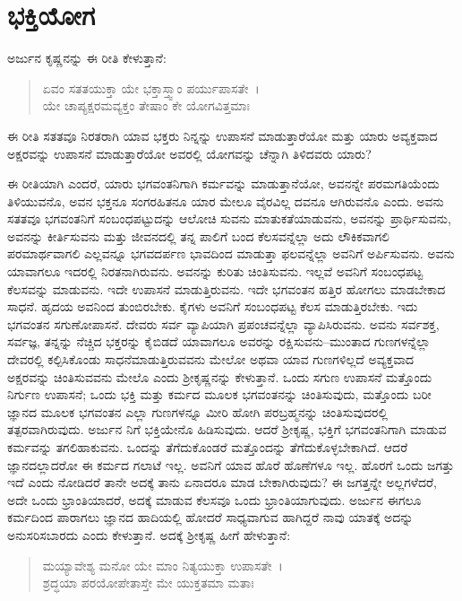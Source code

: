 
\chapter{ಭಕ್ತಿಯೋಗ}

ಅರ್ಜುನ ಕೃಷ್ಣನನ್ನು ಈ ರೀತಿ ಕೇಳುತ್ತಾನೆ:

\begin{verse}
ಏವಂ ಸತತಯುಕ್ತಾ ಯೇ ಭಕ್ತಾಸ್ತ್ವಾಂ ಪರ್ಯುಪಾಸತೇ~।\\ಯೇ ಚಾಪ್ಯಕ್ಷರಮವ್ಯಕ್ತಂ ತೇಷಾಂ ಕೇ ಯೋಗವಿತ್ತಮಾಃ 
\end{verse}

{\small ಈ ರೀತಿ ಸತತವೂ ನಿರತರಾಗಿ ಯಾವ ಭಕ್ತರು ನಿನ್ನನ್ನು ಉಪಾಸನೆ ಮಾಡುತ್ತಾರೆಯೋ ಮತ್ತು ಯಾರು ಅವ್ಯಕ್ತವಾದ ಅಕ್ಷರವನ್ನು ಉಪಾಸನೆ ಮಾಡುತ್ತಾರೆಯೋ ಅವರಲ್ಲಿ ಯೋಗವನ್ನು ಚೆನ್ನಾಗಿ ತಿಳಿದವರು ಯಾರು?}

ಈ ರೀತಿಯಾಗಿ ಎಂದರೆ, ಯಾರು ಭಗವಂತನಿಗಾಗಿ ಕರ್ಮವನ್ನು ಮಾಡುತ್ತಾನೆಯೋ, ಅವನನ್ನೇ ಪರಮಗತಿಯೆಂದು ತಿಳಿಯುವನೊ, ಅವನ ಭಕ್ತನೂ ಸಂಗರಹಿತನೂ ಯಾರ ಮೇಲೂ ವೈರವಿಲ್ಲ ದವನೂ ಆಗಿರುವನೊ ಎಂದು. ಅವನು ಸತತವೂ ಭಗವಂತನಿಗೆ ಸಂಬಂಧಪಟ್ಟುದನ್ನು ಆಲೋಚಿ ಸುವನು ಮಾತುಕತೆಯಾಡುವನು, ಅವನನ್ನು ಪ್ರಾರ್ಥಿಸುವನು, ಅವನನ್ನು ಕೀರ್ತಿಸುವನು ಮತ್ತು ಜೀವನದಲ್ಲಿ ತನ್ನ ಪಾಲಿಗೆ ಬಂದ ಕೆಲಸವನ್ನೆಲ್ಲಾ ಅದು ಲೌಕಿಕವಾಗಲಿ ಪರಮಾರ್ಥವಾಗಲಿ ಎಲ್ಲವನ್ನೂ ಭಗವದರ್ಪಣ ಭಾವದಿಂದ ಮಾಡುತ್ತಾ ಫಲವನ್ನೆಲ್ಲಾ ಅವನಿಗೆ ಅರ್ಪಿಸುವನು. ಅವನು ಯಾವಾಗಲೂ ಇದರಲ್ಲಿ ನಿರತನಾಗಿರುವನು. ಅವನನ್ನು ಕುರಿತು ಚಿಂತಿಸುವನು. ಇಲ್ಲವೆ ಅವನಿಗೆ ಸಂಬಂಧಪಟ್ಟ ಕೆಲಸವನ್ನು ಮಾಡುವನು. ಇದೇ ಉಪಾಸನೆ ಮಾಡುತ್ತಿರುವನು. ಇದೇ ಭಗವಂತನ ಹತ್ತಿರ ಹೋಗಲು ಮಾಡಬೇಕಾದ ಸಾಧನೆ. ಹೃದಯ ಅವನಿಂದ ತುಂಬಿರಬೇಕು. ಕೈಗಳು ಅವನಿಗೆ ಸಂಬಂಧಪಟ್ಟ ಕೆಲಸ ಮಾಡುತ್ತಿರಬೇಕು. ಇದು ಭಗವಂತನ ಸಗುಣೋಪಾಸನೆ. ದೇವರು ಸರ್ವ ವ್ಯಾಪಿಯಾಗಿ ಪ್ರಪಂಚವನ್ನೆಲ್ಲಾ ವ್ಯಾಪಿಸಿರುವನು. ಅವನು ಸರ್ವಶಕ್ತ, ಸರ್ವಜ್ಞ, ತನ್ನನ್ನು ನೆಚ್ಚಿದ ಭಕ್ತರನ್ನು ಕೈಬಿಡದೆ ಯಾವಾಗಲೂ ಅವರನ್ನು ರಕ್ಷಿಸುವನು–ಮುಂತಾದ ಗುಣಗಳನ್ನೆಲ್ಲಾ ದೇವರಲ್ಲಿ ಕಲ್ಪಿಸಿಕೊಂಡು ಸಾಧನೆಮಾಡುತ್ತಿರುವವನು ಮೇಲೋ ಅಥವಾ ಯಾವ ಗುಣಗಳಿಲ್ಲದೆ ಅವ್ಯಕ್ತವಾದ ಅಕ್ಷರವನ್ನು ಚಿಂತಿಸುವವನು ಮೇಲೊ ಎಂದು ಶ‍್ರೀಕೃಷ್ಣನನ್ನು ಕೇಳುತ್ತಾನೆ. ಒಂದು ಸಗುಣ ಉಪಾಸನೆ ಮತ್ತೊಂದು ನಿರ್ಗುಣ ಉಪಾಸನೆ; ಒಂದು ಭಕ್ತಿ ಮತ್ತು ಕರ್ಮದ ಮೂಲಕ ಭಗವಂತನನ್ನು ಚಿಂತಿಸುವುದು, ಮತ್ತೊಂದು ಬರೀ ಜ್ಞಾನದ ಮೂಲಕ ಭಗವಂತನ ಎಲ್ಲಾ ಗುಣಗಳನ್ನೂ ಮೀರಿ ಹೋಗಿ ಪರಬ್ರಹ್ಮನನ್ನು ಚಿಂತಿಸುವುದರಲ್ಲಿ ತತ್ಪರವಾಗಿರುವುದು. ಅರ್ಜುನ ನಿಗೆ ಭಕ್ತಿಯೇನೊ ಹಿಡಿಸುವುದು. ಆದರೆ ಶ‍್ರೀಕೃಷ್ಣ, ಭಕ್ತಿಗೆ ಭಗವಂತನಿಗಾಗಿ ಮಾಡುವ ಕರ್ಮವನ್ನು ತಗಲಿಹಾಕುವನು. ಒಂದನ್ನು ತೆಗೆದುಕೊಂಡರೆ ಮತ್ತೊಂದನ್ನು ತೆಗೆದುಕೊಳ್ಳಬೇಕಾಗಿದೆ. ಆದರೆ ಜ್ಞಾನದಲ್ಲಾದರೋ ಈ ಕರ್ಮದ ಗಲಾಟೆ ಇಲ್ಲ. ಅವನಿಗೆ ಯಾವ ಹೊರೆ ಹೊಣೆಗಳೂ ಇಲ್ಲ. ಹೊರಗೆ ಒಂದು ಜಗತ್ತು ಇದೆ ಎಂದು ನೋಡಿದರೆ ತಾನೇ ಅದಕ್ಕೆ ತಾನು ಏನಾದರೂ ಮಾಡ ಬೇಕಾಗಿರುವುದು? ಈ ಜಗತ್ತನ್ನೇ ಅಲ್ಲಗಳೆದರೆ, ಅದೇ ಒಂದು ಭ್ರಾಂತಿಯಾದರೆ, ಅದಕ್ಕೆ ಮಾಡುವ ಕೆಲಸವೂ ಒಂದು ಭ್ರಾಂತಿಯಾಗುವುದು. ಅರ್ಜುನ ಈಗಲೂ ಕರ್ಮದಿಂದ ಪಾರಾಗಲು ಜ್ಞಾನದ ಹಾದಿಯಲ್ಲಿ ಹೋದರೆ ಸಾಧ್ಯವಾಗುವ ಹಾಗಿದ್ದರೆ ನಾವು ಯಾತಕ್ಕೆ ಅದನ್ನು ಅನುಸರಿಸಬಾರದು ಎಂದು ಕೇಳುತ್ತಾನೆ. ಅದಕ್ಕೆ ಶ‍್ರೀಕೃಷ್ಣ ಹೀಗೆ ಹೇಳುತ್ತಾನೆ:

\begin{verse}
ಮಯ್ಯಾವೇಶ್ಯ ಮನೋ ಯೇ ಮಾಂ ನಿತ್ಯಯುಕ್ತಾ ಉಪಾಸತೇ~।\\ಶ್ರದ್ಧಯಾ ಪರಯೋಪೇತಾಸ್ತೇ ಮೇ ಯುಕ್ತತಮಾ ಮತಾಃ 
\end{verse}

